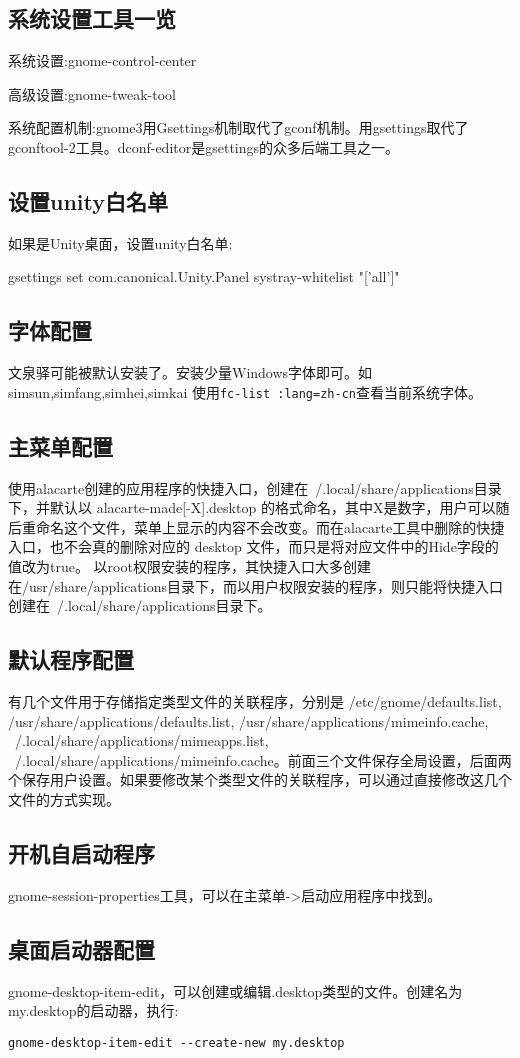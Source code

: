 \subsection{系统设置工具一览}

系统设置:gnome-control-center

高级设置:gnome-tweak-tool

系统配置机制:gnome3用Gsettings机制取代了gconf机制。用gsettings取代了gconftool-2工具。dconf-editor是gsettings的众多后端工具之一。

\subsection{设置unity白名单}
如果是Unity桌面，设置unity白名单:
\begin{shellcmd}
gsettings set com.canonical.Unity.Panel systray-whitelist "['all']"
\end{shellcmd}

\subsection{字体配置}
文泉驿可能被默认安装了。安装少量Windows字体即可。如simsun,simfang,simhei,simkai
使用\verb+fc-list :lang=zh-cn+查看当前系统字体。

\subsection{主菜单配置}
使用alacarte创建的应用程序的快捷入口，创建在~/.local/share/applications目录下，并默认以 alacarte-made[-X].desktop 的格式命名，其中X是数字，用户可以随后重命名这个文件，菜单上显示的内容不会改变。而在alacarte工具中删除的快捷入口，也不会真的删除对应的 desktop 文件，而只是将对应文件中的Hide字段的值改为true。
以root权限安装的程序，其快捷入口大多创建在/usr/share/applications目录下，而以用户权限安装的程序，则只能将快捷入口创建在~/.local/share/applications目录下。

\subsection{默认程序配置}
有几个文件用于存储指定类型文件的关联程序，分别是 /etc/gnome/defaults.list, /usr/share/applications/defaults.list, /usr/share/applications/mimeinfo.cache, ~/.local/share/applications/mimeapps.list, ~/.local/share/applications/mimeinfo.cache。前面三个文件保存全局设置，后面两个保存用户设置。如果要修改某个类型文件的关联程序，可以通过直接修改这几个文件的方式实现。

\subsection{开机自启动程序}
gnome-session-properties工具，可以在主菜单->启动应用程序中找到。

\subsection{桌面启动器配置}
gnome-desktop-item-edit，可以创建或编辑.desktop类型的文件。创建名为my.desktop的启动器，执行:
\begin{verbatim}
gnome-desktop-item-edit --create-new my.desktop
\end{verbatim}










